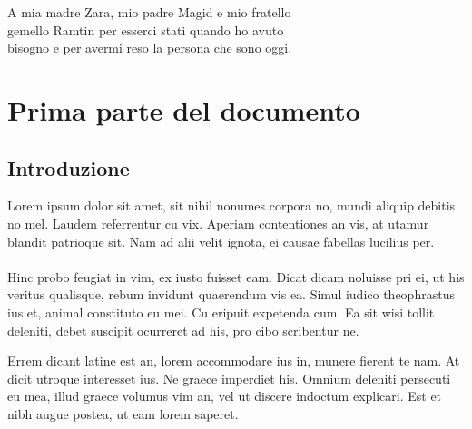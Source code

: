 \documentclass[11pt, a4paper, twoside, openright]{book}
\newcommand{\blankpage}
{
    \null
    \thispagestyle{empty}%
    \addtocounter{page}{-1}%
    \newpage
}
\newenvironment{dedication}
{
    \afterpage{\blankpage}
    \clearpage
    \thispagestyle{empty}
    \vspace*{\stretch{1}}
    \itshape
    \raggedleft
    \afterpage{\blankpage}
}
{
    \par
    \vspace{\stretch{1}}
    \clearpage
}
\begin{document}

\begin{dedication}
    A mia madre Zara, mio padre Magid e mio fratello\\
    gemello Ramtin per esserci stati quando ho avuto\\
    bisogno e per avermi reso la persona che sono oggi.\\
\end{dedication}

\newpage


\tableofcontents
\clearpage

\part{Prima parte del documento}


\chapter{Introduzione}
Lorem ipsum dolor sit amet, sit nihil nonumes corpora no, mundi aliquip debitis
no mel. Laudem referrentur cu vix. Aperiam contentiones an vis, at utamur
blandit patrioque sit. Nam ad alii velit ignota, ei causae fabellas lucilius
per.\\
\\
Hinc probo feugiat in vim, ex iusto fuisset eam. Dicat dicam noluisse pri ei, ut
his veritus qualisque, rebum invidunt quaerendum vis ea. Simul iudico
theophrastus ius et, animal constituto eu mei. Cu eripuit expetenda cum. Ea sit
wisi tollit deleniti, debet suscipit ocurreret ad his, pro cibo scribentur ne.

Errem dicant latine est an, lorem accommodare ius in, munere fierent te nam. At
dicit utroque interesset ius. Ne graece imperdiet his. Omnium deleniti persecuti
eu mea, illud graece volumus vim an, vel ut discere indoctum explicari. Est et
nibh augue postea, ut eam lorem saperet.
\end{document}
